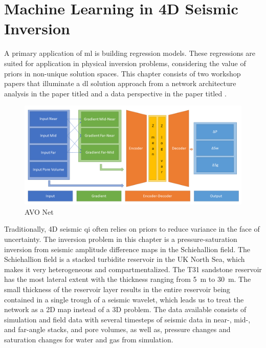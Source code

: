 \section{Machine Learning in 4D Seismic Inversion}

A primary application of \acl{ml} is building regression models. These regressions are suited for application in physical inversion problems, considering the value of priors in non-unique solution spaces. This chapter consists of two workshop papers that illuminate a \ac{dl} solution approach from a network architecture analysis in the paper titled  and a data perspective in the paper titled .

\begin{figure}
    \centering
    \includegraphics[width=\textwidth]{figures/AVO-Net.png}
    \caption{AVO Net \citep[from][]{dramsch2019including}}
    \label{fig:avo-net}
\end{figure}


Traditionally, 4D seismic \acf{qi} often relies on priors to reduce variance in the face of uncertainty. The inversion problem in this chapter is a pressure-saturation inversion from seismic amplitude difference maps in the Schiehallion field. The Schiehallion field is a stacked turbidite reservoir in the UK North Sea, which makes it very heterogeneous and compartmentalized. The T31 sandstone reservoir has the most lateral extent with the thickness ranging from 5~m to 30~m. The small thickness of the reservoir layer results in the entire reservoir being contained in a single trough of a seismic wavelet, which leads us to treat the network as a 2D map instead of a 3D problem. The data available consists of simulation and field data with several timesteps of seismic data in near-, mid-, and far-angle stacks, and pore volumes, as well as, pressure changes and saturation changes for water and gas from simulation.

